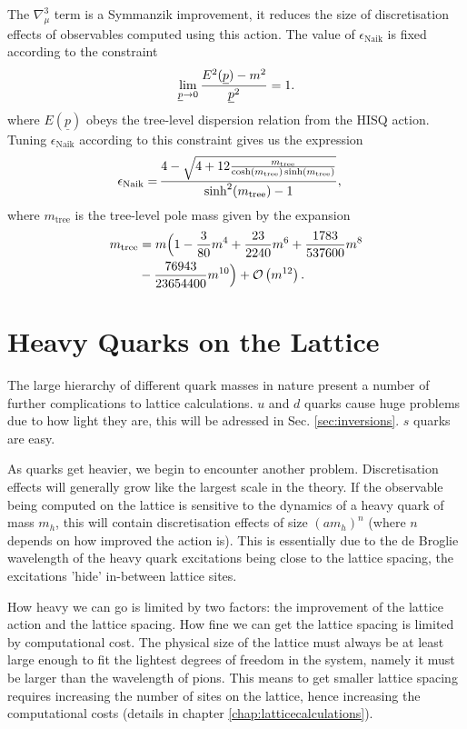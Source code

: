     The $\nabla^3_{\mu}$ term is a Symmanzik improvement, it reduces the size of discretisation effects of observables computed using this action. The value of $\epsilon_{\text{Naik}}$ is fixed according to the constraint
    \begin{align}
      \lim_{\underline{p}\to 0} {E^2(\underline{p})-m^2\over \underline{p}^2} = 1.
    \end{align}
    where $E(\underline{p})$ obeys the tree-level dispersion relation from the HISQ action. Tuning $\epsilon_{\text{Naik}}$ according to this constraint gives us the expression \cite{Monahan:2012dq}
    \begin{align}
      \epsilon_{\text{Naik}} = \,&{ 4 - \sqrt{ 4 + 12 {m_{\text{tree}}\over \cosh(m_{\text{tree}}) \sinh(m_{\text{tree}})} } \over \sinh^2(m_{\text{tree}}) - 1 },
    \end{align}
    where $m_{\text{tree}}$ is the tree-level pole mass given by the expansion \cite{Follana:2006rc}
    \begin{align}
      m_{\text{tree}} &= m\Big( 1 - {3\over 80}m^4 + {23\over 2240}m^6 + {1783\over 537600 }m^8 \\ &- {76943\over 23654400} m^{10} \Big) + \mathcal{O}\left( m^{12} \right). \nonumber
    \end{align}

    \section{Heavy Quarks on the Lattice}

    The large hierarchy of different quark masses in nature present a number of further complications to lattice calculations. $u$ and $d$ quarks cause huge problems due to how light they are, this will be adressed in Sec. \ref{sec:inversions}. $s$ quarks are easy.

    As quarks get heavier, we begin to encounter another problem. Discretisation effects will generally grow like the largest scale in the theory. If the observable being computed on the lattice is sensitive to the dynamics of a heavy quark of mass $m_h$, this will contain discretisation effects of size $(am_h)^n$ (where $n$ depends on how improved the action is). This is essentially due to the de Broglie wavelength of the heavy quark excitations being close to the lattice spacing, the excitations 'hide' in-between lattice sites.

    How heavy we can go is limited by two factors: the improvement of the lattice action and the lattice spacing. How fine we can get the lattice spacing is limited by computational cost. The physical size of the lattice must always be at least large enough to fit the lightest degrees of freedom in the system, namely it must be larger than the wavelength of pions. This means to get smaller lattice spacing requires increasing the number of sites on the lattice, hence increasing the computational costs (details in chapter \ref{chap:latticecalculations}).

